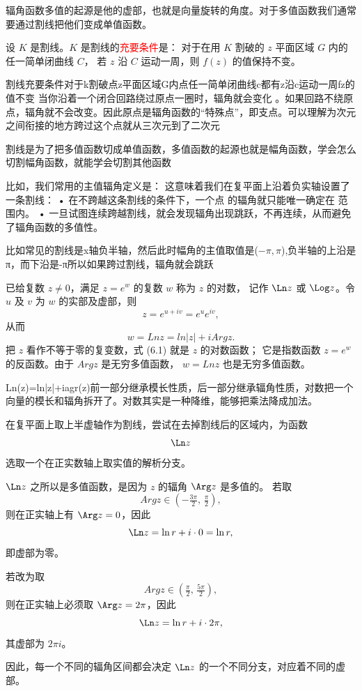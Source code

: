 \documentclass[lang=cn,10pt]{elegantbook}
\begin{document}
辐角函数多值的起源是他的虚部，也就是向量旋转的角度。对于多值函数我们通常要通过割线把他们变成单值函数。
\begin{definition}
设 $K$ 是割线。$K$ 是割线的\textcolor{red}{充要条件}是：  
对于在用 $K$ 割破的 $z$ 平面区域 $G$ 内的任一简单闭曲线 $C$，  
若 $z$ 沿 $C$ 运动一周，则 $f(z)$ 的值保持不变。
\end{definition}
割线充要条件对于k割破点z平面区域G内点任一简单闭曲线c都有z沿c运动一周fz的值不变
当你沿着一个闭合回路绕过原点一圈时，辐角就会变化 。如果回路不绕原点，辐角就不会改变。因此原点是辐角函数的“特殊点”，即支点。可以理解为次元之间衔接的地方跨过这个点就从三次元到了二次元
\begin{dxtips}[割线]
    割线是为了把多值函数切成单值函数，多值函数的起源也就是幅角函数，学会怎么切割幅角函数，就能学会切割其他函数
    
\end{dxtips}
比如，我们常用的主值辐角定义是：
这意味着我们在复平面上沿着负实轴设置了一条割线：
•	在不跨越这条割线的条件下，一个点 的辐角就只能唯一确定在 范围内。
•	一旦试图连续跨越割线，就会发现辐角出现跳跃，不再连续，从而避免了辐角函数的多值性。
\begin{example}
    比如常见的割线是x轴负半轴，然后此时幅角的主值取值是($-\pi,\pi$),负半轴的上沿是π，而下沿是-π所以如果跨过割线，辐角就会跳跃
\end{example}
\begin{definition}[对数函数]
已给复数 $z \neq 0$，满足 $z = e^w$ 的复数 $w$ 称为 $z$ 的对数，
记作 $\Ln z$ 或 $\Log z$。令 $u$ 及 $v$ 为 $w$ 的实部及虚部，则
\[
z = e^{u+iv} = e^u e^{iv},
\]
从而
\[
w = Ln z = ln |z| + i Arg z.\tag{6.1}
\]
把 $z$ 看作不等于零的复变数，式 (6.1) 就是 $z$ 的对数函数；
它是指数函数 $z = e^w$ 的反函数。由于 $Arg z$ 是无穷多值函数，
$w = Ln z$ 也是无穷多值函数。
\end{definition}
\begin{dxtips}
    Ln(z)=ln|z|+iagr(z)前一部分继承模长性质，后一部分继承辐角性质，对数把一个向量的模长和辐角拆开了。对数其实是一种降维，能够把乘法降成加法。
\end{dxtips}
\begin{example}
在复平面上取上半虚轴作为割线，尝试在去掉割线后的区域内，为函数
\[
\Ln z
\]
选取一个在正实数轴上取实值的解析分支。

\medskip
$\Ln z$ 之所以是多值函数，是因为 $z$ 的辐角 $\Arg z$ 是多值的。  
若取
\[
Arg z \in \left(-\tfrac{3\pi}{2},\,\tfrac{\pi}{2}\right),
\]
则在正实轴上有 $\Arg z = 0$，因此
\[
\Ln z = \ln r + i\cdot 0 = \ln r,
\]
即虚部为零。

若改为取
\[
Arg z \in \left(\tfrac{\pi}{2},\,\tfrac{5\pi}{2}\right),
\]
则在正实轴上必须取 $\Arg z = 2\pi$，因此
\[
\Ln z = \ln r + i \cdot 2\pi,
\]
其虚部为 $2\pi i$。

\medskip
因此，每一个不同的辐角区间都会决定 $\Ln z$ 的一个不同分支，对应着不同的虚部。
\end{example}
\end{document}
